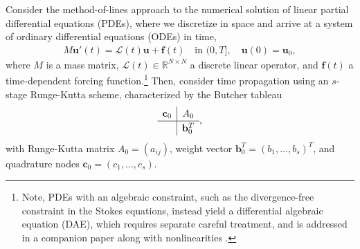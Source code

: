 \documentclass[review]{siamart}
\begin{document}
Consider the method-of-lines approach to the numerical solution of linear
partial differential equations (PDEs), where we discretize in space and arrive
at a system of ordinary differential equations (ODEs) in time,
%
\begin{align*}
M\mathbf{u}'(t) =  \mathcal{L}(t)\mathbf{u} + \mathbf{f}(t)
	\quad\text{in }(0,T], \quad \mathbf{u}(0) = \mathbf{u}_0,
\end{align*}
%
where $M$ is a mass matrix, $\mathcal{L}(t)\in\mathbb{R}^{N\times N}$ a discrete
linear operator, and $\mathbf{f}(t)$ a time-dependent forcing
function.\footnote{Note,
PDEs with an algebraic constraint, such as the divergence-free
constraint in the Stokes equations, instead yield a differential algebraic equation (DAE), which
requires separate careful treatment, and is addressed in a companion paper along with
nonlinearities \cite{irk2}.}
Then, consider time propagation using an $s$-stage Runge-Kutta scheme,
characterized by the Butcher tableau
%
\begin{align*}
	\renewcommand\arraystretch{1.2}
	\begin{array}
	{c|c}
	\mathbf{c}_0 & A_0\\
	\hline
	& \mathbf{b}_0^T
	\end{array},
\end{align*}
%
with Runge-Kutta matrix $A_0 = (a_{ij})$, weight vector $\mathbf{b}_0^T = (b_1,
\ldots, b_s)^T$, and quadrature nodes $\mathbf{c}_0 = (c_1, \ldots, c_s)$.
\end{document}
